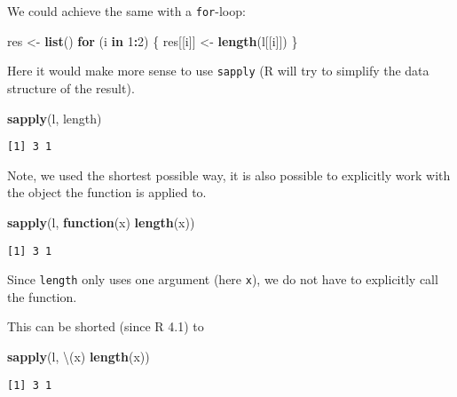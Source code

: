 \documentclass[ignorenonframetext,,t]{beamer}
\let\oldtextbf\textbf
\renewcommand{\textbf}[1]{\textcolor{spamwell}{\oldtextbf{#1}}}
\newenvironment{Shaded}{\begin{snugshade}}{\end{snugshade}}
\newcommand{\ControlFlowTok}[1]{\textcolor[rgb]{0.13,0.29,0.53}{\textbf{#1}}}
\newcommand{\DecValTok}[1]{\textcolor[rgb]{0.00,0.00,0.81}{#1}}
\newcommand{\FunctionTok}[1]{\textcolor[rgb]{0.13,0.29,0.53}{\textbf{#1}}}
\newcommand{\NormalTok}[1]{#1}
\newcommand{\OtherTok}[1]{\textcolor[rgb]{0.56,0.35,0.01}{#1}}
\newcommand{\SpecialCharTok}[1]{\textcolor[rgb]{0.81,0.36,0.00}{\textbf{#1}}}
\begin{document}
\begin{frame}[fragile]
We could achieve the same with a \texttt{for}-loop:

\begin{Shaded}
\begin{Highlighting}[]
\NormalTok{res }\OtherTok{\textless{}{-}} \FunctionTok{list}\NormalTok{()}
\ControlFlowTok{for}\NormalTok{ (i }\ControlFlowTok{in} \DecValTok{1}\SpecialCharTok{:}\DecValTok{2}\NormalTok{) \{}
\NormalTok{  res[[i]] }\OtherTok{\textless{}{-}} \FunctionTok{length}\NormalTok{(l[[i]])}
\NormalTok{\}}
\end{Highlighting}
\end{Shaded}
\end{frame}

\begin{frame}[fragile]
Here it would make more sense to use \texttt{sapply} (R will try to
simplify the data structure of the result).

\begin{Shaded}
\begin{Highlighting}[]
\FunctionTok{sapply}\NormalTok{(l, length)}
\end{Highlighting}
\end{Shaded}

\begin{verbatim}
[1] 3 1
\end{verbatim}
\end{frame}

\begin{frame}[fragile]
Note, we used the shortest possible way, it is also possible to
explicitly work with the object the function is applied to.

\begin{Shaded}
\begin{Highlighting}[]
\FunctionTok{sapply}\NormalTok{(l, }\ControlFlowTok{function}\NormalTok{(x) }\FunctionTok{length}\NormalTok{(x))}
\end{Highlighting}
\end{Shaded}

\begin{verbatim}
[1] 3 1
\end{verbatim}

Since \texttt{length} only uses one argument (here \texttt{x}), we do
not have to explicitly call the function.

This can be shorted (since R 4.1) to

\begin{Shaded}
\begin{Highlighting}[]
\FunctionTok{sapply}\NormalTok{(l, \textbackslash{}(x) }\FunctionTok{length}\NormalTok{(x))}
\end{Highlighting}
\end{Shaded}

\begin{verbatim}
[1] 3 1
\end{verbatim}
\end{frame}
\end{document}
